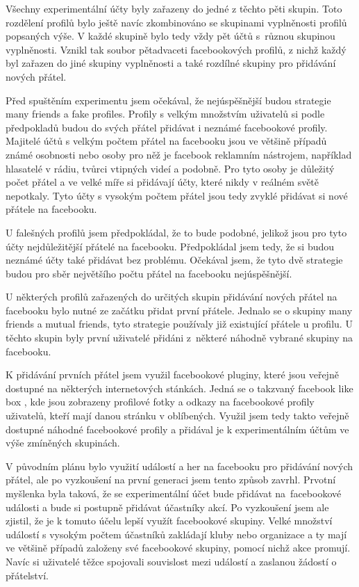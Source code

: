 \documentclass[thesis=M,czech]{FITthesis}[2013/05/10]
\begin{document}
Všechny experimentální účty byly zařazeny do jedné z těchto pěti skupin. Toto rozdělení profilů bylo ještě navíc zkombinováno se skupinami vyplněnosti profilů popsaných výše. V každé skupině bylo tedy vždy pět účtů s~různou skupinou vyplněnosti. Vznikl tak soubor pětadvaceti facebookových profilů, z nichž každý byl zařazen do jiné skupiny vyplněnosti a také rozdílné skupiny pro přidávání nových přátel.

Před spuštěním experimentu jsem očekával, že nejúspěšnější budou strategie many friends a fake profiles. Profily s velkým množstvím uživatelů si podle předpokladů budou do svých přátel přidávat i neznámé facebookové profily. Majitelé účtů s velkým počtem přátel na facebooku jsou ve většině případů známé osobnosti nebo osoby pro něž je facebook reklamním nástrojem, například hlasatelé v rádiu, tvůrci vtipných videí a podobně. Pro tyto osoby je důležitý počet přátel a ve velké míře si přidávají účty, které nikdy v reálném světě nepotkaly. Tyto účty s vysokým počtem přátel jsou tedy zvyklé přidávat si nové přátele na facebooku.

U falešných profilů jsem předpokládal, že to bude podobné, jelikož jsou pro tyto účty nejdůležitější přátelé na facebooku. Předpokládal jsem tedy, že si budou neznámé účty také přidávat bez problému. Očekával jsem, že tyto dvě strategie budou pro sběr největšího počtu přátel na facebooku nejúspěšnější.

U některých profilů zařazených do určitých skupin přidávání nových přátel na facebooku bylo nutné ze začátku přidat první přátele. Jednalo se o skupiny many friends a mutual friends, tyto strategie používaly již existující přátele u profilu. U těchto skupin byly první uživatelé přidáni z~některé náhodně vybrané skupiny na facebooku. 

K přidávání prvních přátel jsem využil facebookové pluginy, které jsou veřejně dostupné na některých internetových stánkách. Jedná se o takzvaný facebook like box \cite{web:fbLikeBox}, kde jsou zobrazeny profilové fotky a odkazy na facebookové profily uživatelů, kteří mají danou stránku v oblíbených. Využil jsem tedy takto veřejně dostupné náhodné facebookové profily a přidával je k experimentálním účtům ve výše zmíněných skupinách.

V původním plánu bylo využití událostí a her na facebooku pro přidávání nových přátel, ale po vyzkoušení na první generaci jsem tento způsob zavrhl. Prvotní myšlenka byla taková, že se experimentální účet bude přidávat na~facebookové události a bude si postupně přidávat účastníky akcí. Po vyzkoušení jsem ale zjistil, že je k tomuto účelu lepší využít facebookové skupiny. Velké množství událostí s vysokým počtem účastníků zakládají kluby nebo organizace a ty mají ve většině případů založeny své facebookové skupiny, pomocí nichž akce promují. Navíc si uživatelé těžce spojovali souvislost mezi událostí a zaslanou žádostí o přátelství.
\end{document}

